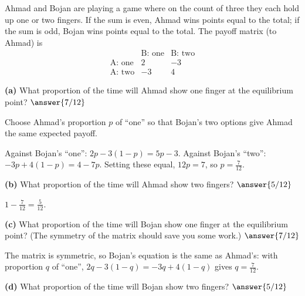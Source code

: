 \documentclass[12pt]{ximera}
\begin{document}
\begin{problem}
Ahmad and Bojan are playing a game where on the count of three they each hold up one or
two fingers. If the sum is even, Ahmad wins points equal to the total; if the sum is
odd, Bojan wins points equal to the total. The payoff matrix (to Ahmad) is
\[
\begin{array}{r|rr}
 & \text{B: one} & \text{B: two}\\\hline
\text{A: one} & 2 & -3\\
\text{A: two} & -3 & 4
\end{array}
\]

\begin{prompt}
\textbf{(a)} What proportion of the time will Ahmad show one finger at the equilibrium
point? $\answer{7/12}$

\begin{hint}
Choose Ahmad's proportion $p$ of ``one'' so that Bojan's two options give Ahmad the same
expected payoff.
\end{hint}

\begin{feedback}
Against Bojan's ``one'': $2p-3(1-p)=5p-3$. Against Bojan's ``two'':
$-3p+4(1-p)=4-7p$. Setting these equal, $12p=7$, so $p=\frac7{12}$.
\end{feedback}
\end{prompt}

\begin{prompt}
\textbf{(b)} What proportion of the time will Ahmad show two fingers?
$\answer{5/12}$

\begin{feedback}
$1-\frac7{12}=\frac5{12}$.
\end{feedback}
\end{prompt}

\begin{prompt}
\textbf{(c)} What proportion of the time will Bojan show one finger at the equilibrium
point? (The symmetry of the matrix should save you some work.) $\answer{7/12}$

\begin{feedback}
The matrix is symmetric, so Bojan's equation is the same as Ahmad's: with proportion $q$
of ``one'', $2q-3(1-q)=-3q+4(1-q)$ gives $q=\frac7{12}$.
\end{feedback}
\end{prompt}

\begin{prompt}
\textbf{(d)} What proportion of the time will Bojan show two fingers?
$\answer{5/12}$


\end{prompt}
\end{problem}
\end{document}
